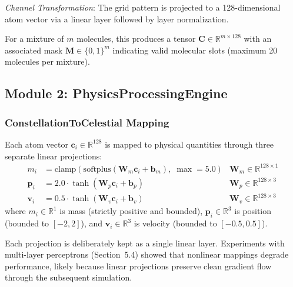 \documentclass[11pt,a4paper]{article}
\begin{document}
\textit{Channel Transformation}: The grid pattern is projected to a 128-dimensional atom vector via a linear layer followed by layer normalization.

For a mixture of $m$ molecules, this produces a tensor $\mathbf{C} \in \mathbb{R}^{m \times 128}$ with an associated mask $\mathbf{M} \in \{0, 1\}^m$ indicating valid molecular slots (maximum 20 molecules per mixture).

\subsection{Module 2: PhysicsProcessingEngine}

\subsubsection{ConstellationToCelestial Mapping}
Each atom vector $\mathbf{c}_i \in \mathbb{R}^{128}$ is mapped to physical quantities through three separate linear projections:
\begin{align}
    m_i &= \text{clamp}(\text{softplus}(\mathbf{W}_m \mathbf{c}_i + \mathbf{b}_m),\; \max=5.0) & \mathbf{W}_m \in \mathbb{R}^{128 \times 1} \\
    \mathbf{p}_i &= 2.0 \cdot \tanh(\mathbf{W}_p \mathbf{c}_i + \mathbf{b}_p) & \mathbf{W}_p \in \mathbb{R}^{128 \times 3} \\
    \mathbf{v}_i &= 0.5 \cdot \tanh(\mathbf{W}_v \mathbf{c}_i + \mathbf{b}_v) & \mathbf{W}_v \in \mathbb{R}^{128 \times 3}
\end{align}
where $m_i \in \mathbb{R}^1$ is mass (strictly positive and bounded), $\mathbf{p}_i \in \mathbb{R}^3$ is position (bounded to $[-2, 2]$), and $\mathbf{v}_i \in \mathbb{R}^3$ is velocity (bounded to $[-0.5, 0.5]$).

Each projection is deliberately kept as a single linear layer. Experiments with multi-layer perceptrons (Section~5.4) showed that nonlinear mappings degrade performance, likely because linear projections preserve clean gradient flow through the subsequent simulation.
\end{document}
